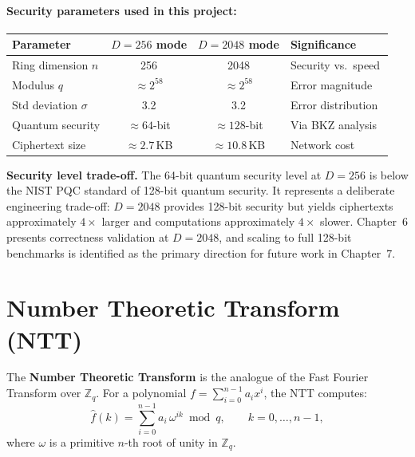 \paragraph{Security parameters used in this project:}
\begin{table}[H]
\centering
\begin{tabular}{@{}lccl@{}}
\toprule
\textbf{Parameter} & \textbf{$D = 256$ mode} & \textbf{$D = 2048$ mode} & \textbf{Significance} \\
\midrule
Ring dimension $n$ & 256  & 2048 & Security vs.\ speed \\
Modulus $q$        & $\approx 2^{58}$ & $\approx 2^{58}$ & Error magnitude \\
Std deviation $\sigma$& 3.2  & 3.2  & Error distribution \\
Quantum security   & $\approx 64$-bit & $\approx 128$-bit & Via BKZ analysis~\cite{albrecht2015hardness} \\
Ciphertext size    & $\approx 2.7$\,KB & $\approx 10.8$\,KB & Network cost \\
\bottomrule
\end{tabular}
\end{table}

\begin{remark}\label{rem:security-tradeoff}
\textbf{Security level trade-off.} The 64-bit quantum security level at $D = 256$ is
below the NIST PQC standard of 128-bit quantum security. It represents a deliberate
engineering trade-off: $D = 2048$ provides 128-bit security but yields ciphertexts
approximately $4\times$ larger and computations approximately $4\times$ slower.
Chapter~6 presents correctness validation at $D = 2048$, and scaling to full 128-bit
benchmarks is identified as the primary direction for future work in Chapter~7.
\end{remark}

\section{Number Theoretic Transform (NTT)}

\begin{definition}[NTT]\label{def:ntt}
The \textbf{Number Theoretic Transform} is the analogue of the Fast Fourier
Transform over $\mathbb{Z}_q$. For a polynomial
$f = \sum_{i=0}^{n-1} a_i x^i$, the NTT computes:
\[
\hat{f}(k) = \sum_{i=0}^{n-1} a_i\, \omega^{ik} \bmod q,
\qquad k = 0, \ldots, n-1,
\]
where $\omega$ is a primitive $n$-th root of unity in $\mathbb{Z}_q$.
\end{definition}

